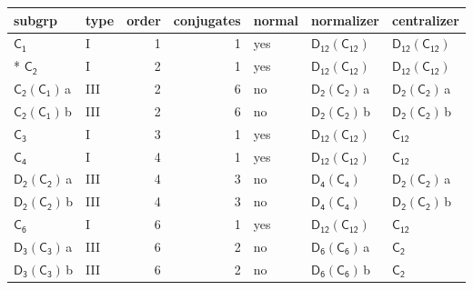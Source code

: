 \documentclass[10pt,a4paper]{article}
\numberwithin{equation}{section}
\newcommand{\grp}[1]{\mathsf{#1}}
\newcommand{\clsletter}[1]{\,{\scriptsize\color{black!55}#1}}
\begin{document}
{\small\begin{longtable}{@{}llrrlll@{}}\toprule
subgrp & type & order & conjugates & normal & normalizer & centralizer\\\midrule\endhead
\bottomrule\endfoot\endlastfoot
\href{../../../rotation/data/pdf/C1.pdf}{$\grp{C_{1}}$} & I & 1 & 1 & yes & \href{D12-C12.pdf}{$\grp{D_{12}}(\grp{C_{12}})$} & \href{D12-C12.pdf}{$\grp{D_{12}}(\grp{C_{12}})$}\\*
\href{../../../rotation/data/pdf/C2.pdf}{$\grp{C_{2}}$} & I & 2 & 1 & yes & \href{D12-C12.pdf}{$\grp{D_{12}}(\grp{C_{12}})$} & \href{D12-C12.pdf}{$\grp{D_{12}}(\grp{C_{12}})$}\\
\href{C2-C1.pdf}{$\grp{C_{2}}(\grp{C_{1}})$}\clsletter{a} & III & 2 & 6 & no & \href{D2-C2.pdf}{$\grp{D_{2}}(\grp{C_{2}})$}\clsletter{a} & \href{D2-C2.pdf}{$\grp{D_{2}}(\grp{C_{2}})$}\clsletter{a}\\
\href{C2-C1.pdf}{$\grp{C_{2}}(\grp{C_{1}})$}\clsletter{b} & III & 2 & 6 & no & \href{D2-C2.pdf}{$\grp{D_{2}}(\grp{C_{2}})$}\clsletter{b} & \href{D2-C2.pdf}{$\grp{D_{2}}(\grp{C_{2}})$}\clsletter{b}\\
\href{../../../rotation/data/pdf/C3.pdf}{$\grp{C_{3}}$} & I & 3 & 1 & yes & \href{D12-C12.pdf}{$\grp{D_{12}}(\grp{C_{12}})$} & \href{../../../rotation/data/pdf/C12.pdf}{$\grp{C_{12}}$}\\
\href{../../../rotation/data/pdf/C4.pdf}{$\grp{C_{4}}$} & I & 4 & 1 & yes & \href{D12-C12.pdf}{$\grp{D_{12}}(\grp{C_{12}})$} & \href{../../../rotation/data/pdf/C12.pdf}{$\grp{C_{12}}$}\\
\href{D2-C2.pdf}{$\grp{D_{2}}(\grp{C_{2}})$}\clsletter{a} & III & 4 & 3 & no & \href{D4-C4.pdf}{$\grp{D_{4}}(\grp{C_{4}})$} & \href{D2-C2.pdf}{$\grp{D_{2}}(\grp{C_{2}})$}\clsletter{a}\\
\href{D2-C2.pdf}{$\grp{D_{2}}(\grp{C_{2}})$}\clsletter{b} & III & 4 & 3 & no & \href{D4-C4.pdf}{$\grp{D_{4}}(\grp{C_{4}})$} & \href{D2-C2.pdf}{$\grp{D_{2}}(\grp{C_{2}})$}\clsletter{b}\\
\href{../../../rotation/data/pdf/C6.pdf}{$\grp{C_{6}}$} & I & 6 & 1 & yes & \href{D12-C12.pdf}{$\grp{D_{12}}(\grp{C_{12}})$} & \href{../../../rotation/data/pdf/C12.pdf}{$\grp{C_{12}}$}\\
\href{D3-C3.pdf}{$\grp{D_{3}}(\grp{C_{3}})$}\clsletter{a} & III & 6 & 2 & no & \href{D6-C6.pdf}{$\grp{D_{6}}(\grp{C_{6}})$}\clsletter{a} & \href{../../../rotation/data/pdf/C2.pdf}{$\grp{C_{2}}$}\\
\href{D3-C3.pdf}{$\grp{D_{3}}(\grp{C_{3}})$}\clsletter{b} & III & 6 & 2 & no & \href{D6-C6.pdf}{$\grp{D_{6}}(\grp{C_{6}})$}\clsletter{b} & \href{../../../rotation/data/pdf/C2.pdf}{$\grp{C_{2}}$}\\

\end{longtable}}
\end{document}
